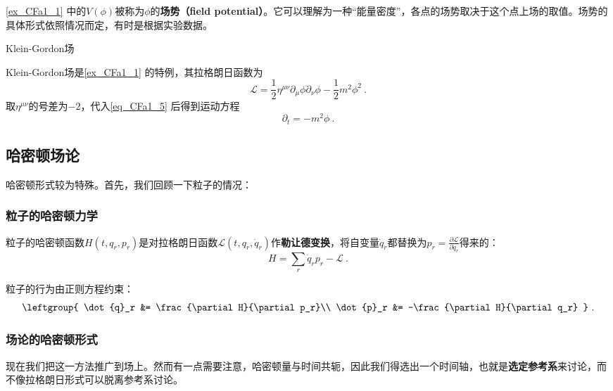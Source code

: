 \autoref{ex_CFa1_1} 中的$V(\phi)$被称为$\phi$的\textbf{场势（field potential）}。它可以理解为一种“能量密度”，各点的场势取决于这个点上场的取值。场势的具体形式依照情况而定，有时是根据实验数据。



\begin{example}{Klein-Gordon场}

Klein-Gordon场是\autoref{ex_CFa1_1} 的特例，其拉格朗日函数为
\begin{equation}
\mathcal{L} = \frac{1}{2}\eta^{\mu\nu}\partial_\mu\phi\partial_\nu\phi - \frac{1}{2}m^2\phi^2~.
\end{equation}
取$\eta^{\mu\nu}$的号差为$-2$，代入\autoref{eq_CFa1_5} 后得到运动方程
\begin{equation}
\partial_t = -m^2\phi
 ~.
\end{equation}


\end{example}




\subsection{哈密顿场论}

哈密顿形式较为特殊。首先，我们回顾一下粒子的情况：

\subsubsection{粒子的哈密顿力学}

粒子的哈密顿函数$H(t, q_r, p_r)$是对拉格朗日函数$\mathcal{L}(t, q_r, \dot{q}_r)$作\textbf{勒让德变换}，将自变量$\dot{q}_r$都替换为$p_r=\frac{\partial \mathcal{L}}{\partial \dot{q}_r}$得来的：
\begin{equation}
H = \sum_r \dot{q}_rp_r-\mathcal{L}~.
\end{equation}

粒子的行为由正则方程约束：
\begin{equation}
\leftgroup{
    \dot{q}_r &= \frac{\partial H}{\partial p_r}\\
    \dot{p}_r &= -\frac{\partial H}{\partial q_r}
}~.
\end{equation}



\subsubsection{场论的哈密顿形式}


现在我们把这一方法推广到场上。然而有一点需要注意，哈密顿量与时间共轭，因此我们得选出一个时间轴，也就是\textbf{选定参考系}来讨论，而不像拉格朗日形式可以脱离参考系讨论。




















